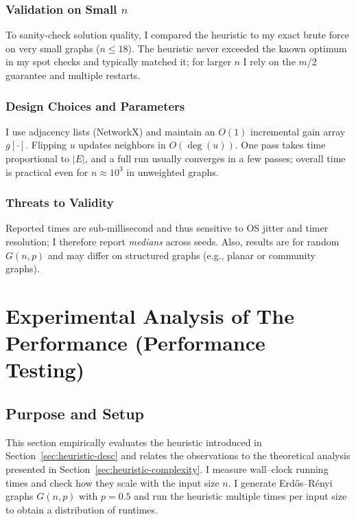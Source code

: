 \documentclass[12pt]{article}
\begin{document}
\subsubsection*{Validation on Small $n$}
To sanity-check solution quality, I compared the heuristic to my exact brute force on very small graphs ($n\le 18$). The heuristic never exceeded the known optimum in my spot checks and typically matched it; for larger $n$ I rely on the $m/2$ guarantee and multiple restarts.

\subsubsection*{Design Choices and Parameters}
I use adjacency lists (NetworkX) and maintain an $O(1)$ incremental gain array $g[\cdot]$. Flipping $u$ updates neighbors in $O(\deg(u))$. One pass takes time proportional to $|E|$, and a full run usually converges in a few passes; overall time is practical even for $n\approx 10^3$ in unweighted graphs.

\subsubsection*{Threats to Validity}
Reported times are sub-millisecond and thus sensitive to OS jitter and timer resolution; I therefore report \emph{medians} across seeds. Also, results are for random $G(n,p)$ and may differ on structured graphs (e.g., planar or community graphs).
\section{Experimental Analysis of The Performance (Performance Testing)}
\label{sec:perf}

\subsection{Purpose and Setup}
This section empirically evaluates the heuristic introduced in Section~\ref{sec:heuristic-desc} and relates the observations to the theoretical analysis presented in Section~\ref{sec:heuristic-complexity}. I measure wall–clock running times and check how they scale with the input size \(n\). I generate Erd\H{o}s--R\'enyi graphs
\(G(n,p)\) with \(p=0.5\) and run the heuristic multiple times per input size to obtain
a distribution of runtimes.
\end{document}
